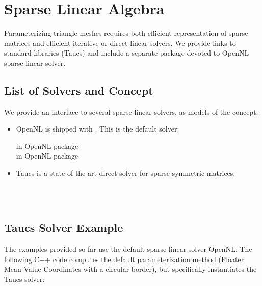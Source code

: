 \section{Sparse Linear Algebra}

Parameterizing triangle meshes requires both efficient representation
of sparse matrices and efficient iterative or direct linear
solvers. We provide links to standard libraries ({\sc Taucs})
and include a separate package devoted to OpenNL sparse linear solver.

\subsection{List of Solvers and Concept}

We provide an interface to several sparse linear solvers, as models
of the  concept:

\begin{itemize}

\item OpenNL \cite{cgal:l-nmdgp-05} is shipped with \cgal. This is the default solver:

 in OpenNL package  \\
 in OpenNL package  \\

\item {\sc Taucs} is a state-of-the-art direct solver for sparse symmetric matrices.

  \\
  \\

\end{itemize}


\subsection{{\sc Taucs} Solver Example}

The examples provided so far use the default sparse linear solver
OpenNL. The following C++ code computes the default parameterization
method (Floater Mean Value Coordinates with a circular border), but
specifically instantiates the {\sc Taucs} solver:

